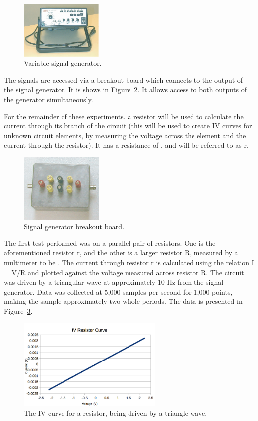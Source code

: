 \documentclass[journal]{IEEEtran}
\begin{document}
\begin{figure}[ht!]
\centering
\includegraphics[width=40mm]{signal_gen.png}
\caption{Variable signal generator.}
\label{fig:sig_gen}
\end{figure}

The signals are accessed via a breakout board which connects to the output of
the signal generator. It is shows in Figure~\ref{fig:breakout}. It allows access to both
outputs of the generator simultaneously.

For the remainder of these experiments, a resistor will be used to calculate
the current through its branch of the circuit (this will be used to create IV
curves for unknown circuit elements, by measuring the voltage across the
element and the current through the resistor). It has a resistance of
, and will be referred to as r.

\begin{figure}[ht!]
\centering
\includegraphics[width=40mm]{breakout.png}
\caption{Signal generator breakout board.}
\label{fig:breakout}
\end{figure}

The first test performed was on a parallel pair of resistors. One is the
aforementioned resistor r, and the other is a larger resistor R, measured by a
multimeter to be . The current through resistor r is
calculated using the relation I = V/R and plotted against the voltage measured
across resistor R. The circuit was driven by a triangular wave at approximately
10 Hz from the signal generator. Data was collected at 5,000 samples per second
for 1,000 points, making the sample approximately two whole periods. The data
    is presented in Figure~\ref{fig:res_series}.

\begin{figure}[ht!]
\centering
\includegraphics[width=70mm]{iv_resistor.png}
\caption{The IV curve for a resistor, being driven by a triangle wave.}
\label{fig:res_series}
\end{figure}
\end{document}
